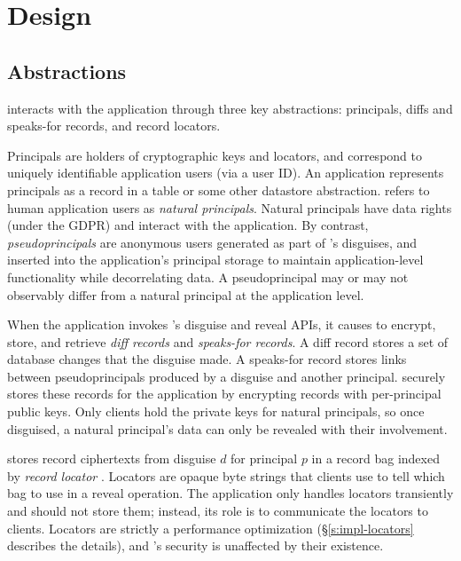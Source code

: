\section{Design}
\label{s:design}

\subsection{Abstractions}
%
\sys interacts with the application through three key abstractions:
\one{} principals, \two{} diffs and speaks-for records, and
\three{} record locators.
%

%
Principals are holders of cryptographic keys and locators, and correspond to
uniquely identifiable application users (\eg via a user ID).
%
An application represents principals as a record in a  table or some
other datastore abstraction.
%
\sys refers to human application users as \emph{natural principals}.
%
Natural principals have data rights (\eg under the GDPR) and interact with
the application.
%
By contrast, \emph{pseudoprincipals} are anonymous users generated as part of
\sys's disguises, and inserted into the application's principal storage
to maintain application-level functionality while decorrelating data.
%
A pseudoprincipal may or may not observably differ from a natural principal
at the application level.
%

%
When the application invokes \sys's disguise and reveal APIs, it causes
\sys to encrypt, store, and retrieve \emph{diff records} and
\emph{speaks-for records}.
%
A diff record stores a set of database changes that the disguise made.
%
A speaks-for record stores links between pseudoprincipals produced by a
disguise and another principal.
%
\sys securely stores these records for the application by encrypting records
with per-principal public keys.
%
Only clients hold the private keys for natural principals, so once disguised,
a natural principal's data can only be revealed with their involvement.
%

%
\sys stores record ciphertexts from disguise $d$ for principal $p$ in a record
bag indexed by \emph{record locator }.
%
Locators are opaque byte strings that clients use to tell \sys which bag to
use in a reveal operation.
%
The application only handles locators transiently and should not store them;
instead, its role is to communicate the locators to clients.
%
Locators are strictly a performance optimization (\S\ref{s:impl-locators}
describes the details), and \sys's security is unaffected by their existence.
%

